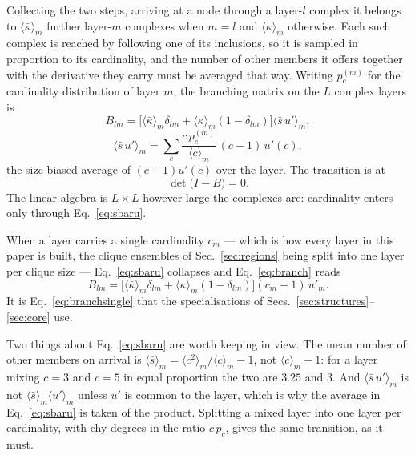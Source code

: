 \documentclass[aps,pre,twocolumn,superscriptaddress,floatfix]{revtex4-2}
\newcommand{\ave}[1]{\langle #1 \rangle}
\newcommand{\kbar}{\bar\kappa}
\newcommand{\sbar}{\bar s}
\begin{document}
Collecting the two steps, arriving at a node through a layer-$l$ complex it
belongs to $\ave{\kbar}_m$ further layer-$m$ complexes when $m=l$ and
$\ave{\kappa}_m$ otherwise. Each such complex is reached by following one of its
inclusions, so it is sampled in proportion to its cardinality, and the number of
other members it offers together with the derivative they carry must be averaged
that way. Writing $p^{(m)}_c$ for the cardinality distribution of layer $m$, the
branching matrix on the $L$ complex layers is
\begin{equation}
  B_{lm}=\Big[\ave{\kbar}_m\delta_{lm}+\ave{\kappa}_m(1-\delta_{lm})\Big]
         \Big\langle \sbar\,u'\Big\rangle_m ,
  \label{eq:branch}
\end{equation}
\begin{equation}
  \Big\langle \sbar\,u'\Big\rangle_m
    =\sum_{c}\frac{c\,p^{(m)}_c}{\ave{c}_m}\,(c-1)\,u'(c),
  \label{eq:sbaru}
\end{equation}
the size-biased average of $(c-1)u'(c)$ over the layer. The transition is at
\begin{equation}
  \det\big(I-B\big)=0 .
  \label{eq:det}
\end{equation}
The linear algebra is $L\times L$ however large the complexes are: cardinality
enters only through Eq.~\eqref{eq:sbaru}.

When a layer carries a single cardinality $c_m$ --- which is how every layer in
this paper is built, the clique ensembles of Sec.~\ref{sec:regions} being split
into one layer per clique size --- Eq.~\eqref{eq:sbaru} collapses and
Eq.~\eqref{eq:branch} reads
\begin{equation}
  B_{lm}=\Big[\ave{\kbar}_m\delta_{lm}+\ave{\kappa}_m(1-\delta_{lm})\Big]
         (c_m-1)\,u'_m .
  \label{eq:branchsingle}
\end{equation}
It is Eq.~\eqref{eq:branchsingle} that the specialisations of
Secs.~\ref{sec:structures}--\ref{sec:core} use.

Two things about Eq.~\eqref{eq:sbaru} are worth keeping in view. The mean number
of other members on arrival is $\ave{\sbar}_m=\ave{c^2}_m/\ave{c}_m-1$, not
$\ave{c}_m-1$: for a layer mixing $c=3$ and $c=5$ in equal proportion the two
are $3.25$ and $3$. And $\ave{\sbar\,u'}_m$ is not $\ave{\sbar}_m\ave{u'}_m$
unless $u'$ is common to the layer, which is why the average in
Eq.~\eqref{eq:sbaru} is taken of the product. Splitting a mixed layer into one
layer per cardinality, with chy-degrees in the ratio $c\,p_c$, gives the same
transition, as it must.
\end{document}
